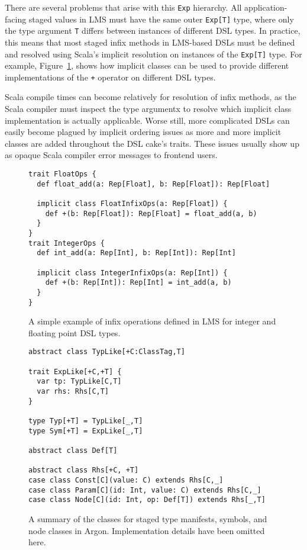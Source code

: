 There are several problems that arise with this \texttt{Exp} hierarchy.
All application-facing staged values in LMS must have the same outer \texttt{Exp[T]} type, where only the type argument \texttt{T} differs between instances of different DSL types. In practice,
this means that most staged infix methods in LMS-based DSLs must be defined and resolved using Scala's implicit resolution on instances of the \texttt{Exp[T]} type. For example, Figure~\ref{fig:lms-ir-example}, shows how implicit classes can be used to provide different implementations
of the \texttt{+} operator on different DSL types.

Scala compile times can become relatively for resolution of infix methods, as the Scala compiler must inspect the type argumentx
to resolve which implicit class implementation is actually applicable.
Worse still, more complicated DSLs can easily become plagued by implicit
ordering issues as more and more implicit classes are added throughout the
DSL cake's traits. These issues usually show up as opaque
Scala compiler error messages to frontend users.

\begin{figure}
\begin{lstlisting}[language=ScalaBig]
trait FloatOps {
  def float_add(a: Rep[Float], b: Rep[Float]): Rep[Float]

  implicit class FloatInfixOps(a: Rep[Float]) {
    def +(b: Rep[Float]): Rep[Float] = float_add(a, b)
  }
}
trait IntegerOps {
  def int_add(a: Rep[Int], b: Rep[Int]): Rep[Int]

  implicit class IntegerInfixOps(a: Rep[Int]) {
    def +(b: Rep[Int]): Rep[Int] = int_add(a, b)
  }
}
\end{lstlisting}
\caption{A simple example of infix operations defined in LMS for integer and floating point DSL types.}
\label{fig:lms-ir-example}
\end{figure}

\begin{figure}
\begin{lstlisting}[language=ScalaBig]
abstract class TypLike[+C:ClassTag,T]

trait ExpLike[+C,+T] {
  var tp: TypLike[C,T]
  var rhs: Rhs[C,T]
}

type Typ[+T] = TypLike[_,T]
type Sym[+T] = ExpLike[_,T]

abstract class Def[T]

abstract class Rhs[+C, +T]
case class Const[C](value: C) extends Rhs[C,_]
case class Param[C](id: Int, value: C) extends Rhs[C,_]
case class Node[C](id: Int, op: Def[T]) extends Rhs[_,T]
\end{lstlisting}
\caption{A summary of the classes for staged type manifests, symbols, and node classes in Argon. Implementation details have been omitted here.}
\label{fig:argon-ir}
\end{figure}

